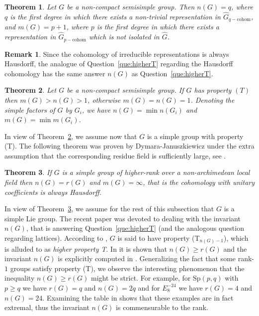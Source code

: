 \documentclass[12pt,reqno]{amsart}
\newtheorem{mainthm}{Theorem}
\theoremstyle{definition}
\newtheorem{remark}[theorem]{Remark}
\begin{document}
\begin{mainthm}\label{intro: theorem isolation}
    Let $G$ be a non-compact semisimple group. Then $n(G)=q$, where $q$ is the first degree in which there exists a non-trivial representation in $\widehat{G}_{q-\mathrm{cohom}}$, 
    and $m(G)=p+1$, where $p$ is the first degree in which there exists a representation in $\widehat{G}_{p-\mathrm{cohom}}$ which is not isolated in $\widehat{G}$.
\end{mainthm}

\begin{remark}
Since the cohomology of irreducible representations is always Hausdorff, the analogue of Question~\ref{que:higherT} regarding the Hausdorff cohomology has the same answer $n(G)$ as Question~\ref{que:higherT}.
\end{remark}

\begin{mainthm} \label{intro: m>n>1}
    Let $G$ be a non-compact semisimple group.
    If $G$ has property $(T)$ then $m(G)>n(G)>1$, otherwise $m(G)=n(G)=1$.
    Denoting the simple factors of $G$ by $G_i$, we have $n(G)=\min n(G_i)$ and $m(G)=\min m(G_i)$.
\end{mainthm}

In view of Theorem~\ref{intro: m>n>1}, we assume now that $G$ is a simple group with property (T).
The following theorem was proven by Dymara-Januszkiewicz under the extra assumption that the corresponding residue field is sufficiently large, see \cite{Dymara-Januszkiewicz}.

\begin{mainthm} \label{intro: p-adic}
    If $G$ is a simple group of higher-rank over a non-archimedean local field then $n(G)=r(G)$ and $m(G)=\infty$, that is the cohomology with unitary coefficients is always Hausdorff.
\end{mainthm}

In view of Theorem~\ref{intro: p-adic}, we assume for the rest of this subsection that $G$ is a simple Lie group.
The recent paper \cite{BaderSauer} was devoted to dealing with the invariant $n(G)$, that is answering Question~\ref{que:higherT} (and the analogous question regarding lattices).
According to \cite[Definition 1.1]{BaderSauer}, $G$ is said to have property (T$_{n(G)-1}$), which is alluded to as \emph{higher property T}.
In \cite[Theorem A]{BaderSauer} it is shown that $n(G)\geq r(G)$ and the invariant $n(G)$ is explicitly computed in \cite[Theorem B and Appendix A]{BaderSauer}.
Generalizing the fact that some rank-$1$ groups satisfy property (T),
we observe the interesting phenomenon that the inequality $n(G)\geq r(G)$ might be strict.
For example, for $\mathrm{Sp}(p,q)$ with $p\geq q$ we have $r(G)=q$ and $n(G)=2q$
and for $E_8^{-24}$ we have $r(G)=4$ and $n(G)=24$.
Examining the table in \cite[Appendix A]{BaderSauer} shows that these examples are in fact extremal, thus the invariant $n(G)$ is commensurable to the rank.
\end{document}
